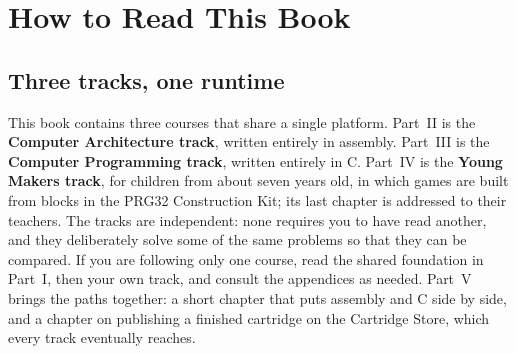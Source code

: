 \chapter*{How to Read This Book}

\section*{Three tracks, one runtime}

This book contains three courses that share a single platform. Part~II is the
\textbf{Computer Architecture track}, written entirely in \riscv assembly.
Part~III is the \textbf{Computer Programming track}, written entirely in C.
Part~IV is the \textbf{Young Makers track}, for children from about seven years
old, in which games are built from blocks in the PRG32 Construction Kit; its
last chapter is addressed to their teachers. The tracks are independent: none
requires you to have read another, and they deliberately solve some of the same
problems so that they can be compared. If you are following only one course,
read the shared foundation in Part~I, then your own track, and consult the
appendices as needed. Part~V brings the paths together: a short chapter that
puts assembly and C side by side, and a chapter on publishing a finished
cartridge on the Cartridge Store, which every track eventually reaches.

\begin{center}
\end{center}

